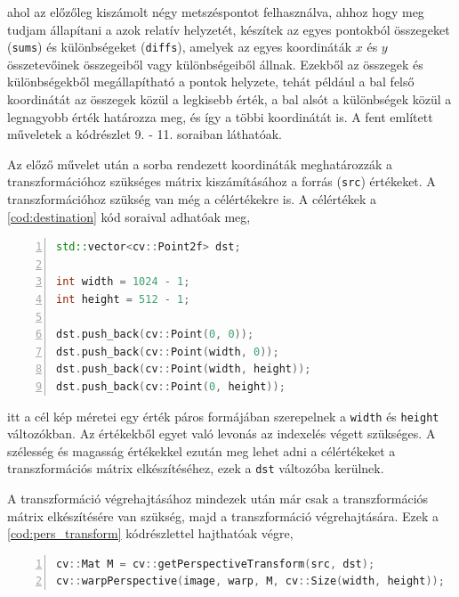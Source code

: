 \par ahol az előzőleg kiszámolt négy metszéspontot felhasználva, ahhoz hogy meg tudjam állapítani a azok relatív helyzetét, készítek az egyes pontokból összegeket (\lstinline{sums}) és különbségeket (\lstinline{diffs}), amelyek az egyes koordináták $x$ és $y$ összetevőinek összegeiből vagy különbségeiből állnak. Ezekből az összegek és különbségekből megállapítható a pontok helyzete, tehát például a bal felső koordinátát az összegek közül a legkisebb érték, a bal alsót a különbségek közül a legnagyobb érték határozza meg, és így a többi koordinátát is. A fent említett műveletek a kódrészlet 9. - 11. soraiban láthatóak.
\par Az előző művelet után a sorba rendezett koordináták meghatározzák a transzformációhoz szükséges mátrix kiszámításához a forrás (\lstinline{src}) értékeket. A transzformációhoz szükség van még a célértékekre is.
\newline A célértékek a \ref{cod:destination} kód soraival adhatóak meg,

\begin{codewrapper}
\begin{lstlisting}[language=C++, numbers=left, caption={A kimeneti értékek megadása.}, label={cod:destination}]
std::vector<cv::Point2f> dst;

int width = 1024 - 1;
int height = 512 - 1;

dst.push_back(cv::Point(0, 0));
dst.push_back(cv::Point(width, 0));
dst.push_back(cv::Point(width, height));
dst.push_back(cv::Point(0, height));
\end{lstlisting}
\end{codewrapper}

\par itt a cél kép méretei egy érték páros formájában szerepelnek a \lstinline{width} és \lstinline{height} változókban. Az értékekből egyet való levonás az indexelés végett szükséges. A szélesség és magasság értékekkel ezután meg lehet adni a célértékeket a transzformációs mátrix elkészítéséhez, ezek a \lstinline{dst} változóba kerülnek.
\par A transzformáció végrehajtásához mindezek után már csak a transzformációs mátrix elkészítésére van szükség, majd a transzformáció végrehajtására.
\newline Ezek a \ref{cod:pers_transform} kódrészlettel hajthatóak végre,

\begin{codewrapper}
\begin{lstlisting}[language=C++, numbers=left, caption={A transzformáció végrehajtása.}, label={cod:pers_transform}]
cv::Mat M = cv::getPerspectiveTransform(src, dst);
cv::warpPerspective(image, warp, M, cv::Size(width, height));
\end{lstlisting}
\end{codewrapper}

